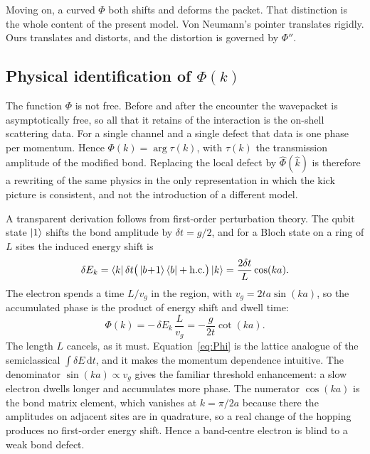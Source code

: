 \documentclass[10pt,
 amsmath,amssymb,
 aps,prb, twocolumn
]{revtex4-2}
\begin{document}
Moving on, a curved $\Phi$ both shifts and deforms the packet. That
distinction is the whole content of the present model. Von Neumann's
pointer translates rigidly. Ours translates and distorts, and the
distortion is governed by $\Phi''$.

\subsection{Physical identification of \texorpdfstring{$\Phi(k)$}{Phi(k)}}
\label{app:vn:Phi}

The function $\Phi$ is not free. Before and after the encounter the
wavepacket is asymptotically free, so all that it retains of the
interaction is the on-shell scattering data. For a single channel and a
single defect that data is one phase per momentum. Hence
$\Phi(k)=\arg\tau(k)$, with $\tau(k)$ the transmission amplitude of the
modified bond. Replacing the local defect by $\hat\Phi(\hat k)$ is
therefore a rewriting of the same physics in the only representation in
which the kick picture is consistent, and not the introduction of a
different model.

A transparent derivation follows from first-order perturbation theory. The
qubit state $\ket{1}$ shifts the bond amplitude by $\delta t=g/2$, and for a
Bloch state on a ring of $L$ sites the induced energy shift is
\begin{equation}
\delta E_k=\bra{k}\delta t\big(\ket{b\!+\!1}\bra{b}+\mathrm{h.c.}\big)\ket{k}
=\frac{2\delta t}{L}\cos(ka).
\label{eq:dE}
\end{equation}
The electron spends a time $L/v_g$ in the region, with $v_g=2ta\sin(ka)$,
so the accumulated phase is the product of energy shift and dwell time:
\begin{equation}
\Phi(k)=-\,\delta E_k\,\frac{L}{v_g}
=-\frac{g}{2t}\cot(ka).
\label{eq:Phi}
\end{equation}
The length $L$ cancels, as it must. Equation~\eqref{eq:Phi} is the lattice
analogue of the semiclassical $\int\!\delta E\,\mathrm{d}t$, and it makes
the momentum dependence intuitive. The denominator $\sin(ka)\propto v_g$
gives the familiar threshold enhancement: a slow electron dwells longer and
accumulates more phase. The numerator $\cos(ka)$ is the bond matrix element,
which vanishes at $k=\pi/2a$ because there the amplitudes on adjacent sites
are in quadrature, so a real change of the hopping produces no first-order
energy shift. Hence a band-centre electron is blind to a weak bond defect.
\end{document}
